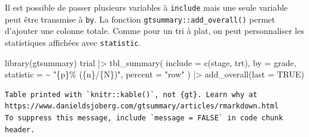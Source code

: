 \documentclass[
  letterpaper,
  DIV=11,
  numbers=noendperiod,
  oneside]{scrreprt}
\newenvironment{Shaded}{\begin{snugshade}}{\end{snugshade}}
\newcommand{\AttributeTok}[1]{\textcolor[rgb]{0.40,0.45,0.13}{#1}}
\newcommand{\ConstantTok}[1]{\textcolor[rgb]{0.56,0.35,0.01}{#1}}
\newcommand{\FunctionTok}[1]{\textcolor[rgb]{0.28,0.35,0.67}{#1}}
\newcommand{\NormalTok}[1]{\textcolor[rgb]{0.00,0.23,0.31}{#1}}
\newcommand{\SpecialCharTok}[1]{\textcolor[rgb]{0.37,0.37,0.37}{#1}}
\newcommand{\StringTok}[1]{\textcolor[rgb]{0.13,0.47,0.30}{#1}}
\begin{document}
Il est possible de passer plusieurs variables à \texttt{include} mais
une seule variable peut être transmise à \texttt{by}. La fonction
\texttt{gtsummary::add\_overall()} permet d'ajouter une colonne totale.
Comme pour un tri à plat, on peut personnaliser les statistiques
affichées avec \texttt{statistic}.

\begin{Shaded}
\begin{Highlighting}[]
\FunctionTok{library}\NormalTok{(gtsummary)}
\NormalTok{trial }\SpecialCharTok{|\textgreater{}} 
  \FunctionTok{tbl\_summary}\NormalTok{(}
    \AttributeTok{include =} \FunctionTok{c}\NormalTok{(stage, trt),}
    \AttributeTok{by =}\NormalTok{ grade,}
    \AttributeTok{statistic =} \SpecialCharTok{\textasciitilde{}} \StringTok{"\{p\}\% (\{n\}/\{N\})"}\NormalTok{,}
    \AttributeTok{percent =} \StringTok{"row"}
\NormalTok{  ) }\SpecialCharTok{|\textgreater{}} 
  \FunctionTok{add\_overall}\NormalTok{(}\AttributeTok{last =} \ConstantTok{TRUE}\NormalTok{)}
\end{Highlighting}
\end{Shaded}

\begin{verbatim}
Table printed with `knitr::kable()`, not {gt}. Learn why at
https://www.danieldsjoberg.com/gtsummary/articles/rmarkdown.html
To suppress this message, include `message = FALSE` in code chunk header.
\end{verbatim}
\end{document}
